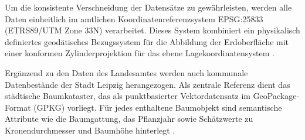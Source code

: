 Um die konsistente Verschneidung der Datensätze zu gewährleisten, werden alle Daten einheitlich im amtlichen Koordinatenreferenzsystem EPSG:25833 (ETRS89/UTM Zone 33N) verarbeitet. Dieses System kombiniert ein physikalisch definiertes geodätisches Bezugssystem für die Abbildung der Erdoberfläche mit einer konformen Zylinderprojektion für das ebene Lagekoordinatensystem \cite{zotero-item-43}.

Ergänzend zu den Daten des Landesamtes werden auch kommunale Datenbestände der Stadt Leipzig herangezogen. Als zentrale Referenz dient das städtische Baumkataster, das als punktbasierter Vektordatensatz im GeoPackage-Format (\ac{GPKG}) vorliegt. Für jedes enthaltene Baumobjekt sind semantische Attribute wie die Baumgattung, das Pflanzjahr sowie Schätzwerte zu Kronendurchmesser und Baumhöhe hinterlegt \cite{zotero-item-46}.
 